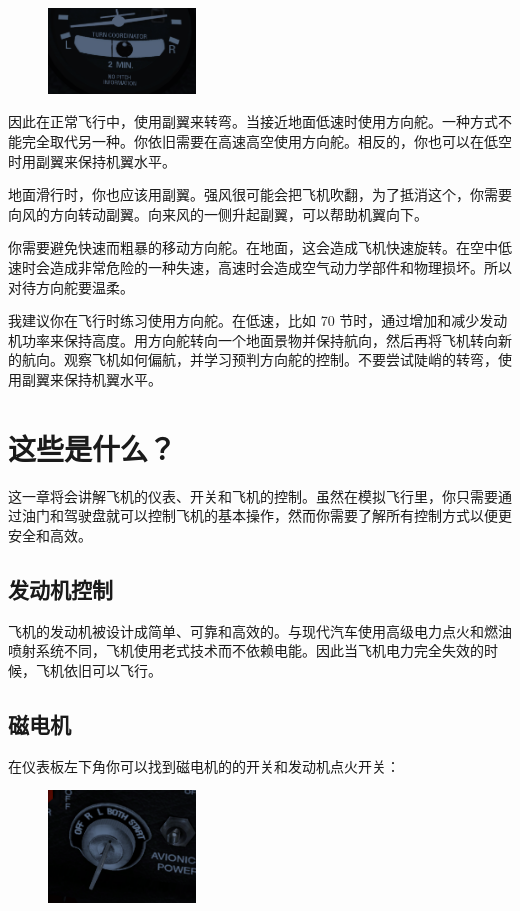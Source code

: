 \begin{figure}
  \includegraphics[width=0.35\textwidth]{img/basic_tutorial/turn-coordinator-2}
\end{figure}

因此在正常飞行中，使用副翼来转弯。当接近地面低速时使用方向舵。一种方式不能完全取代另一种。你依旧需要在高速高空使用方向舵。相反的，你也可以在低空时用副翼来保持机翼水平。

地面滑行时，你也应该用副翼。强风很可能会把飞机吹翻，为了抵消这个，你需要向风的方向转动副翼。向来风的一侧升起副翼，可以帮助机翼向下。

你需要避免快速而粗暴的移动方向舵。在地面，这会造成飞机快速旋转。在空中低速时会造成非常危险的一种失速，高速时会造成空气动力学部件和物理损坏。所以对待方向舵要温柔。

我建议你在飞行时练习使用方向舵。在低速，比如 70 节时，通过增加和减少发动机功率来保持高度。用方向舵转向一个地面景物并保持航向，然后再将飞机转向新的航向。观察飞机如何偏航，并学习预判方向舵的控制。不要尝试陡峭的转弯，使用副翼来保持机翼水平。

\section{这些是什么？}

这一章将会讲解飞机的仪表、开关和飞机的控制。虽然在模拟飞行里，你只需要通过油门和驾驶盘就可以控制飞机的基本操作，然而你需要了解所有控制方式以便更安全和高效。

\subsection{发动机控制}
\label{sec:EngineControl}

飞机的发动机被设计成简单、可靠和高效的。与现代汽车使用高级电力点火和燃油喷射系统不同，飞机使用老式技术而不依赖电能。因此当飞机电力完全失效的时候，飞机依旧可以飞行。

\subsection*{磁电机}

在仪表板左下角你可以找到磁电机的的开关和发动机点火开关：
\begin{figure}
  \includegraphics[width=0.35\textwidth]{img/basic_tutorial/mags}
\end{figure}

